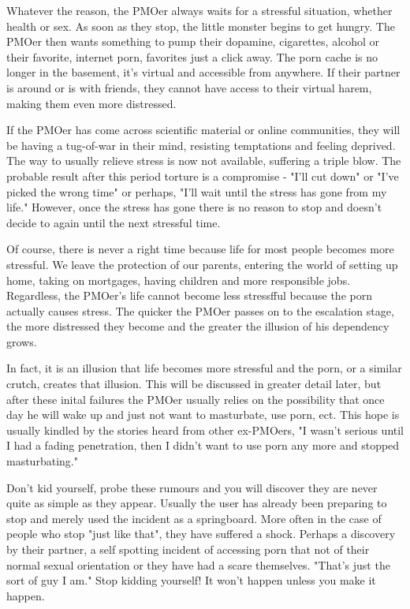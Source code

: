 \documentclass[easypeasy.tex]{subfiles}
\begin{document}
Whatever the reason, the PMOer always waits for a stressful situation, whether health or sex. As soon as they stop, the little monster begins to get hungry. The PMOer then wants something to pump their dopamine, cigarettes, alcohol or their favorite, internet porn, favorites just a click away. The porn cache is no longer in the basement, it's virtual and accessible from anywhere. If their partner is around or is with friends, they cannot have access to their virtual harem, making them even more distressed.

If the PMOer has come across scientific material or online communities, they will be having a tug-of-war in their mind, resisting temptations and feeling deprived. The way to usually relieve stress is now not available, suffering a triple blow. The probable result after this period torture is a compromise - "I'll cut down" or "I've picked the wrong time" or perhaps, "I'll wait until the stress has gone from my life." However, once the stress has gone there is no reason to stop and doesn't decide to again until the next stressful time.

Of course, there is never a right time because life for most people becomes more stressful. We leave the protection of our parents, entering the world of setting up home, taking on mortgages, having children and more responsible jobs. Regardless, the PMOer's life cannot become less stressfful because the porn actually causes stress. The quicker the PMOer passes on to the escalation stage, the more distressed they become and the greater the illusion of his dependency grows.

In fact, it is an illusion that life becomes more stressful and the porn, or a similar crutch, creates that illusion. This will be discussed in greater detail later, but after these inital failures the PMOer usually relies on the possibility that once day he will wake up and just not want to masturbate, use porn, ect. This hope is usually kindled by the stories heard from other ex-PMOers, "I wasn't serious until I had a fading penetration, then I didn't want to use porn any more and stopped masturbating."

Don't kid yourself, probe these rumours and you will discover they are never quite as simple as they appear. Usually the user has already been preparing to stop and merely used the incident as a springboard. More often in the case of people who stop "just like that", they have suffered a shock. Perhaps a discovery by their partner, a self spotting incident of accessing porn that not of their normal sexual orientation or they have had a scare themselves. "That's just the sort of guy I am." Stop kidding yourself! It won't happen unless you make it happen.
\end{document}
